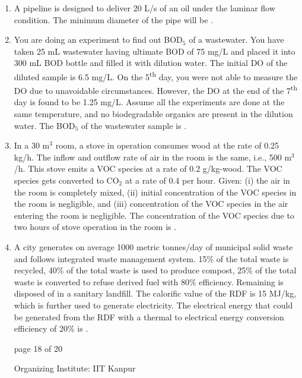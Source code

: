 \documentclass[journal,12pt,onecolumn]{IEEEtran}
\theoremstyle{remark}
\begin{document}
\begin{enumerate}[start=1, label={Q\arabic*.}]
\item A pipeline is designed to deliver 20 L/s of an oil  under the laminar flow condition. The minimum diameter of the pipe will be \underline{\hspace{2cm}} .  
\hfill{}

\item You are doing an experiment to find out BOD$_5$ of a wastewater. You have taken 25 mL wastewater having ultimate BOD of 75 mg/L and placed it into 300 mL BOD bottle and filled it with dilution water. The initial DO of the diluted sample is 6.5 mg/L. On the 5\textsuperscript{th} day, you were not able to measure the DO due to unavoidable circumstances. However, the DO at the end of the 7\textsuperscript{th} day is found to be 1.25 mg/L. Assume all the experiments are done at the same temperature, and no biodegradable organics are present in the dilution water. The BOD$_5$ of the wastewater sample is \underline{\hspace{2cm}} .  
\hfill{}
\item In a 30 m$^3$ room, a stove in operation consumes wood at the rate of 0.25 kg/h. The inflow and outflow rate of air in the room is the same, i.e., 500 m$^3$/h. This stove emits a VOC species at a rate of 0.2 g/kg-wood. The VOC species gets converted to CO$_2$ at a rate of 0.4 per hour. Given: (i) the air in the room is completely mixed, (ii) initial concentration of the VOC species in the room is negligible, and (iii) concentration of the VOC species in the air entering the room is negligible. The concentration of the VOC species due to two hours of stove operation in the room is \underline{\hspace{2cm}} .  
\hfill{}

\item A city generates on average 1000 metric tonnes/day of municipal solid waste and follows integrated waste management system. 15\% of the total waste is recycled, 40\% of the total waste is used to produce compost, 25\% of the total waste is converted to refuse derived fuel  with 80\% efficiency. Remaining is disposed of in a sanitary landfill. The calorific value of the RDF is 15 MJ/kg, which is further used to generate electricity. The electrical energy that could be generated from the RDF with a thermal to electrical energy conversion efficiency of 20\% is \underline{\hspace{2cm}} .  
\hfill{}
\vfill
\begin{center}
{\Large page 18 of 20}
\end{center}
\RaggedRight
{\color{orange}
{\Large Organizing Institute: IIT Kanpur}}
\newpage
\begin{figure}
    

\end{figure}
\end{enumerate}
\end{document}
